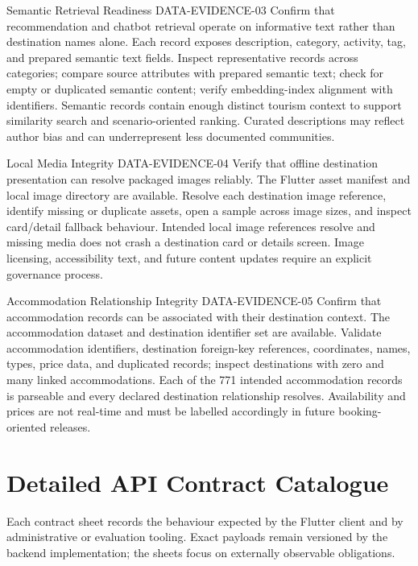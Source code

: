 \EvidenceSheet
{Semantic Retrieval Readiness}
{DATA-EVIDENCE-03}
{Confirm that recommendation and chatbot retrieval operate on informative text rather than destination names alone.}
{Each record exposes description, category, activity, tag, and prepared semantic text fields.}
{Inspect representative records across categories; compare source attributes with prepared semantic text; check for empty or duplicated semantic content; verify embedding-index alignment with identifiers.}
{Semantic records contain enough distinct tourism context to support similarity search and scenario-oriented ranking.}
{Curated descriptions may reflect author bias and can underrepresent less documented communities.}

\EvidenceSheet
{Local Media Integrity}
{DATA-EVIDENCE-04}
{Verify that offline destination presentation can resolve packaged images reliably.}
{The Flutter asset manifest and local image directory are available.}
{Resolve each destination image reference, identify missing or duplicate assets, open a sample across image sizes, and inspect card/detail fallback behaviour.}
{Intended local image references resolve and missing media does not crash a destination card or details screen.}
{Image licensing, accessibility text, and future content updates require an explicit governance process.}

\EvidenceSheet
{Accommodation Relationship Integrity}
{DATA-EVIDENCE-05}
{Confirm that accommodation records can be associated with their destination context.}
{The accommodation dataset and destination identifier set are available.}
{Validate accommodation identifiers, destination foreign-key references, coordinates, names, types, price data, and duplicated records; inspect destinations with zero and many linked accommodations.}
{Each of the 771 intended accommodation records is parseable and every declared destination relationship resolves.}
{Availability and prices are not real-time and must be labelled accordingly in future booking-oriented releases.}

\chapter{Detailed API Contract Catalogue}
\label{app:api_contracts}

Each contract sheet records the behaviour expected by the Flutter client and by
administrative or evaluation tooling. Exact payloads remain versioned by the
backend implementation; the sheets focus on externally observable obligations.

